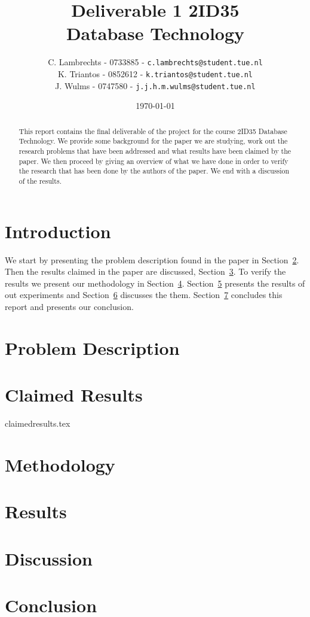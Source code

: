 \documentclass[a4paper,twoside,11pt]{article}
\title{\vspace{-\baselineskip}\sffamily\bfseries Deliverable 1 2ID35 \\ Database Technology }
\author{
C. Lambrechts - 0733885 - {\tt c.lambrechts@student.tue.nl} \\
K. Triantos - 0852612 - {\tt k.triantos@student.tue.nl}\\
J. Wulms - 0747580 - {\tt j.j.h.m.wulms@student.tue.nl}\\
}
\date{\today}
\numberwithin{equation}{section}
\begin{document}
\maketitle
\thispagestyle{empty}
\begin{abstract}
This report contains the final deliverable of the project for the course 2ID35 Database Technology. We provide some background for the paper we are studying, work out the research problems that have been addressed and what results have been claimed by the paper. We then proceed by giving an overview of what we have done in order to verify the research that has been done by the authors of the paper. We end with a discussion of the results.
\end{abstract}

\section{Introduction} \label{sec:Introduction}

We start by presenting the problem description found in the paper in Section~\ref{sec:ProblemDescription}. Then the results claimed in the paper are discussed, Section~\ref{sec:ClaimedResults}. To verify the results we present our methodology in Section~\ref{sec:Methodology}. Section~\ref{sec:Results} presents the results of out experiments and Section~\ref{sec:Discussion} discusses the them. Section~\ref{sec:Conclusion} concludes this report and presents our conclusion. 

\section{Problem Description} \label{sec:ProblemDescription}


\section{Claimed Results} \label{sec:ClaimedResults}
 {claimedresults.tex}

\section{Methodology} \label{sec:Methodology}

\section{Results} \label{sec:Results}


\section{Discussion} \label{sec:Discussion}


\section{Conclusion} \label{sec:Conclusion}

%


\end{document}
